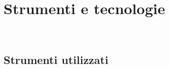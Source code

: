 
\chapter{Strumenti e tecnologie}
\label{cap:strumenti-e-tecnologie}

\\

\section{Strumenti utilizzati}

